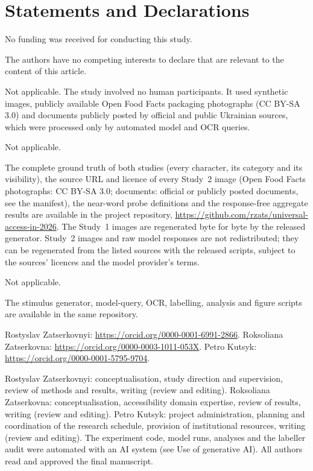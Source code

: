 \documentclass[pdflatex,sn-mathphys-num]{sn-jnl}%
\theoremstyle{thmstyleone}%
\theoremstyle{thmstyletwo}%
\theoremstyle{thmstylethree}%
\begin{document}
\section*{Statements and Declarations}

No funding was received for conducting this study.

The authors have no competing interests to declare that are relevant to the content of this article.

Not applicable. The study involved no human participants. It used synthetic images, publicly available Open Food Facts packaging photographs (CC BY-SA 3.0) and documents publicly posted by official and public Ukrainian sources, which were processed only by automated model and OCR queries.

Not applicable.

The complete ground truth of both studies (every character, its category and its visibility), the source URL and licence of every Study~2 image (Open Food Facts photographs: CC BY-SA 3.0; documents: official or publicly posted documents, see the manifest), the near-word probe definitions and the response-free aggregate results are available in the project repository, \url{https://github.com/rzats/universal-access-in-2026}. The Study~1 images are regenerated byte for byte by the released generator. Study~2 images and raw model responses are not redistributed; they can be regenerated from the listed sources with the released scripts, subject to the sources' licences and the model provider's terms.

Not applicable.

The stimulus generator, model-query, OCR, labelling, analysis and figure scripts are available in the same repository.

Rostyslav Zatserkovnyi: \url{https://orcid.org/0000-0001-6991-2866}. Roksoliana Zatserkovna: \url{https://orcid.org/0000-0003-1011-053X}. Petro Kutsyk: \url{https://orcid.org/0000-0001-5795-9704}.

Rostyslav Zatserkovnyi: conceptualisation, study direction and supervision, review of methods and results, writing (review and editing). Roksoliana Zatserkovna: conceptualisation, accessibility domain expertise, review of results, writing (review and editing). Petro Kutsyk: project administration, planning and coordination of the research schedule, provision of institutional resources, writing (review and editing). The experiment code, model runs, analyses and the labeller audit were automated with an AI system (see Use of generative AI). All authors read and approved the final manuscript.
\end{document}
